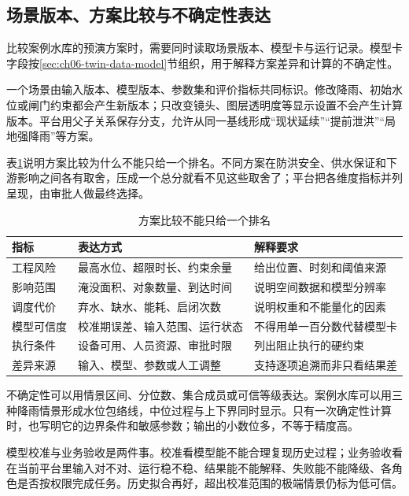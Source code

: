 \subsection{场景版本、方案比较与不确定性表达}\label{sec:ch08-twin-model-card}

比较案例水库的预演方案时，需要同时读取场景版本、模型卡与运行记录。模型卡字段按\ref{sec:ch06-twin-data-model}节组织，用于解释方案差异和计算的不确定性。

一个场景由输入版本、模型版本、参数集和评价指标共同标识。修改降雨、初始水位或闸门约束都会产生新版本；只改变镜头、图层透明度等显示设置不会产生计算版本。平台用父子关系保存分支，允许从同一基线形成“现状延续”“提前泄洪”“局地强降雨”等方案。

表\ref{tab:scenario-comparison}说明方案比较为什么不能只给一个排名。不同方案在防洪安全、供水保证和下游影响之间各有取舍，压成一个总分就看不见这些取舍了；平台把各维度指标并列呈现，由审批人做最终选择。

\begin{table}[htbp]
\centering
\caption{方案比较不能只给一个排名}
\label{tab:scenario-comparison}
\begin{tabular}{p{2.4cm}p{4.4cm}p{5.7cm}}
\toprule
指标 & 表达方式 & 解释要求 \\
\midrule
工程风险 & 最高水位、超限时长、约束余量 & 给出位置、时刻和阈值来源 \\
影响范围 & 淹没面积、对象数量、到达时间 & 说明空间数据和模型分辨率 \\
调度代价 & 弃水、缺水、能耗、启闭次数 & 说明权重和不能量化的因素 \\
模型可信度 & 校准期误差、输入范围、运行状态 & 不得用单一百分数代替模型卡 \\
执行条件 & 设备可用、人员资源、审批时限 & 列出阻止执行的硬约束 \\
差异来源 & 输入、模型、参数或人工调整 & 支持逐项追溯而非只看结果差 \\
\bottomrule
\end{tabular}
\end{table}

不确定性可以用情景区间、分位数、集合成员或可信等级表达。案例水库可以用三种降雨情景形成水位包络线，中位过程与上下界同时显示。只有一次确定性计算时，也写明它的边界条件和敏感参数；输出的小数位多，不等于精度高。

模型校准与业务验收是两件事。校准看模型能不能合理复现历史过程；业务验收看在当前平台里输入对不对、运行稳不稳、结果能不能解释、失败能不能降级、各角色是否按权限完成任务。历史拟合再好，超出校准范围的极端情景仍标为低可信。


